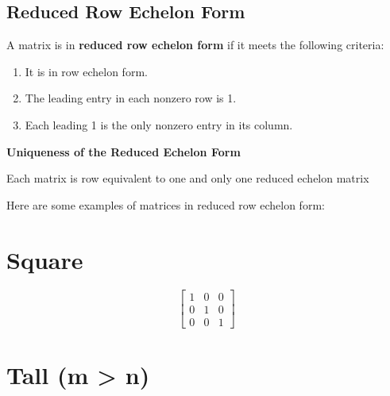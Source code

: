 \documentclass[
  letterpaper,
  DIV=11,
  numbers=noendperiod]{scrreprt}
\providecommand{\tightlist}{%
  \setlength{\itemsep}{0pt}\setlength{\parskip}{0pt}}\usepackage{longtable,booktabs,array}
\begin{document}
\hypertarget{reduced-row-echelon-form}{%
\section*{Reduced Row Echelon Form}\label{reduced-row-echelon-form}}


A matrix is in \textbf{reduced row echelon form} if it meets the
following criteria:

\begin{enumerate}
\def\labelenumi{\arabic{enumi}.}
\tightlist
\item
  It is in row echelon form.
\item
  The leading entry in each nonzero row is 1.
\item
  Each leading 1 is the only nonzero entry in its column.
\end{enumerate}

\begin{tcolorbox}[enhanced jigsaw, leftrule=.75mm, opacityback=0, title=\textcolor{quarto-callout-note-color}{\faInfo}\hspace{0.5em}{Theorem 1}, coltitle=black, breakable, colbacktitle=quarto-callout-note-color!10!white, colframe=quarto-callout-note-color-frame, toprule=.15mm, bottomtitle=1mm, arc=.35mm, toptitle=1mm, opacitybacktitle=0.6, bottomrule=.15mm, rightrule=.15mm, titlerule=0mm, colback=white, left=2mm]

\textbf{Uniqueness of the Reduced Echelon Form}

Each matrix is row equivalent to one and only one reduced echelon matrix

\end{tcolorbox}

Here are some examples of matrices in reduced row echelon form:

\chapter{Square}

\[
\begin{bmatrix}
    1 & 0 & 0 \\
    0 & 1 & 0 \\
    0 & 0 & 1 
\end{bmatrix}
\]

\chapter{Tall (m \textgreater{} n)}
\end{document}
